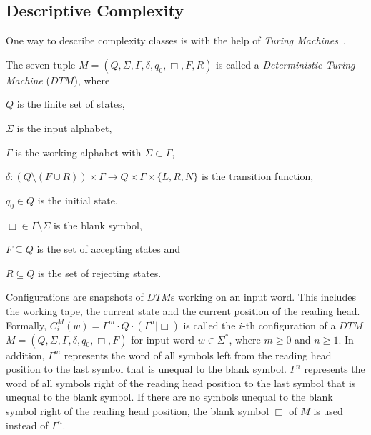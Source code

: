 
\subsection{Descriptive Complexity}\label{subsec:descriptiveComplexity}

One way to describe complexity classes is with the help of \textit{Turing Machines}~\cite{hopcroft1994einfuehrung}.

\begin{definition}
    The seven-tuple $M = (Q, \Sigma, \Gamma, \delta, q_0, \Box, F, R)$ is called a \emph{Deterministic Turing Machine}
    ($\mathit{DTM}$),
    where
    \begin{compactitem}
        \item $Q$ is the finite set of states,
        \item $\Sigma$ is the input alphabet,
        \item $\Gamma$ is the working alphabet with $\Sigma \subset \Gamma$,
        \item $\delta : (Q \setminus (F \cup R)) \times \Gamma \rightarrow Q \times \Gamma \times \{L, R, N\}$ is the
        transition function,
        \item $q_0 \in Q$ is the initial state,
        \item $\Box \in \Gamma \setminus \Sigma$ is the blank symbol,
        \item $F \subseteq Q$ is the set of accepting states and
        \item $R \subseteq Q$ is the set of rejecting states.
    \end{compactitem}
\end{definition}

Configurations are snapshots of $\mathit{DTM}$s working on an input word. This includes the working tape, the current
state and the current position of the reading head. Formally, $C_i^M(w) = \Gamma^m \cdot Q \cdot (\Gamma^n | \Box)$
is called the $i$-th configuration of a $\mathit{DTM}$ $M = (Q, \Sigma, \Gamma, \delta, q_0, \Box, F)$ for input word
$w \in \Sigma^*$, where $m \geq 0$ and $n \geq 1$. In addition, $\Gamma^m$ represents the word of all symbols left
from the reading head position to the last symbol that is unequal to the blank symbol. $\Gamma^n$ represents the word
of all symbols right of the reading head position to the last symbol that is unequal to the blank symbol. If there
are no symbols unequal to the blank symbol right of the reading head position, the blank symbol $\Box$ of $M$ is used
instead of $\Gamma^n$.

